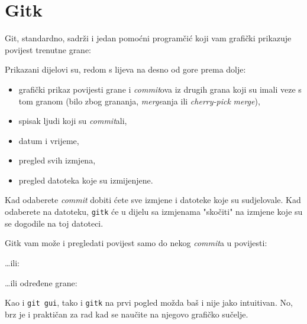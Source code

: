 \section*{Gitk}

Git, standardno, sadrži i jedan pomoćni programčić koji vam grafički prikazuje povijest trenutne grane:


Prikazani dijelovi su, redom s lijeva na desno od gore prema dolje:

\begin{itemize}
	\item grafički prikaz povijesti grane i \emph{commit}ova iz drugih grana koji su imali veze s tom granom (bilo zbog grananja, \emph{merge}anja ili \emph{cherry-pick} \emph{merge}),
	\item spisak ljudi koji su \emph{commit}ali,
	\item datum i vrijeme, 
	\item pregled svih izmjena,
	\item pregled datoteka koje su izmijenjene.
\end{itemize}

Kad odaberete \emph{commit} dobiti ćete sve izmjene i datoteke koje su sudjelovale.
Kad odaberete na datoteku, \verb+gitk+ će u dijelu sa izmjenama "skočiti" na izmjene koje su se dogodile na toj datoteci.

Gitk vam može i pregledati povijest samo do nekog \emph{commit}a u povijesti:


\dots{}ili:


\dots{}ili određene grane:


Kao i \verb+git gui+, tako i \verb+gitk+ na prvi pogled možda baš i nije jako intuitivan.
No, brz je i praktičan za rad kad se naučite na njegovo grafičko sučelje.

